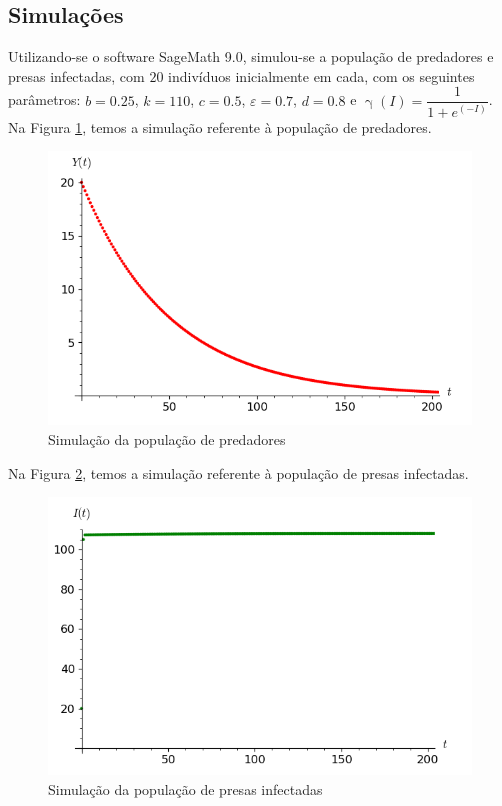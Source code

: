 \documentclass{article}
\begin{document}
\subsection{Simulações}
Utilizando-se o software SageMath 9.0, simulou-se a população de predadores e presas infectadas, com $20$ indivíduos inicialmente em cada, com os seguintes parâmetros: $b = 0.25$, $k = 110$, $c = 0.5$, $\varepsilon = 0.7$, $d = 0.8$ e $\upgamma(I) = \dfrac{1}{1 + e^{(- I)}}$. Na Figura \ref{fig:simulacao_Y}, temos a simulação referente à população de predadores.
\begin{figure}[H]
    \centering
    \includegraphics[scale = 0.7]{simulacao_Y.PNG} 
    \caption{Simulação da população de predadores}
    \label{fig:simulacao_Y}
\end{figure}

Na Figura \ref{fig:simulacao_I}, temos a simulação referente à população de presas infectadas.
\begin{figure}[H]
    \centering
    \includegraphics[scale = 0.7]{simulacao_I.PNG} 
    \caption{Simulação da população de presas infectadas}
    \label{fig:simulacao_I}
\end{figure}
\end{document}
